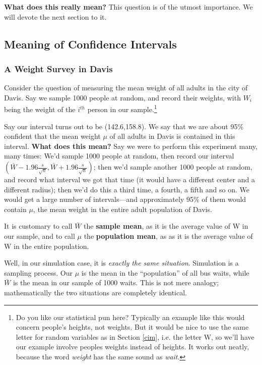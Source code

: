 {\bf What does this really mean?}  This question is of the utmost
importance.  We will devote the next section to it.

\subsection{Meaning of Confidence Intervals}

\subsubsection{A Weight Survey in Davis}

Consider the question of measuring the mean weight of all adults in the
city of Davis.  Say we sample 1000 people at random, and record their
weights, with $W_i$ being the weight of the $i^{th}$ person in our
sample.\footnote{Do you like our statistical pun here?  Typically an
example like this would concern people's heights, not weights.  But it
would be nice to use the same letter for random variables as in Section
\ref{cim}, i.e. the letter W, so we'll have our example involve peoples
weights instead of heights.  It works out neatly, because the word {\it
weight} has the same sound as {\it wait}.}

Say our interval turns out to be (142.6,158.8).  We say that we are
about 95\% confident that the mean weight $\mu$ of all adults in Davis
is contained in this interval.  {\bf What does this mean?}  Say we were
to perform this experiment many, many times:  We'd sample 1000 people at
random, then record our interval $(\bar{W} - 1.96 \frac{s}{\sqrt{n}},
\bar{W} + 1.96 \frac{s}{\sqrt{n}})$; then we'd sample another 1000
people at random, and record what interval we got that time (it would
have a different center and a different radius); then we'd do this a
third time, a fourth, a fifth and so on.  We would get a large number of
intervals---and approximately 95\% of them would contain $\mu$, the mean
weight in the entire adult population of Davis.

\checkpoint

It is customary to call $\bar{W}$ the {\bf sample mean}, as it is the
average value of W in our sample, and to call $\mu$ the {\bf population
mean}, as as it is the average value of W in the entire population.

Well, in our simulation case, it is {\it exactly the same situation}.
Simulation is a sampling process.  Our $\mu$ is the mean in the
``population'' of all bus waits, while $\bar{W}$ is the mean in our
sample of 1000 waits.  This is not mere analogy; mathematically the two
situations are completely identical.

